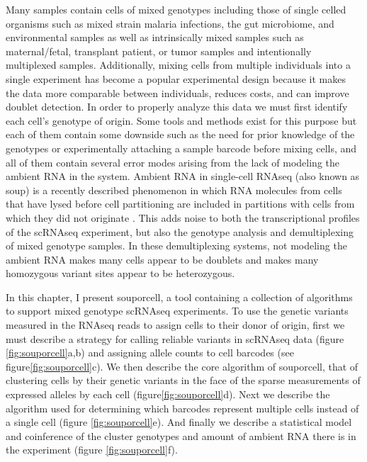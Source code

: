 \par{
Many samples contain cells of mixed genotypes including those of single celled organisms such as mixed strain malaria infections, 
the gut microbiome, and environmental samples as well 
as intrinsically mixed samples such as maternal/fetal, transplant patient, or tumor samples and intentionally multiplexed samples.
Additionally, mixing cells from multiple individuals into a single experiment has become a popular experimental design because it makes the data more comparable between individuals, reduces costs, and can improve doublet detection. 
 In order to properly 
analyze this data we must first identify each cell's genotype of origin. Some tools and methods exist for this purpose \cite{demuxlet} \cite{cellhashing} \cite{scsplit} 
but each of them contain some downside such as the need for prior knowledge of the genotypes or experimentally attaching a sample barcode before mixing cells, and all of them 
contain several error modes arising from the lack of modeling the ambient RNA in the system. Ambient RNA in single-cell RNAseq (also known as soup) is a recently described 
phenomenon in which RNA molecules from cells that have lysed before cell partitioning are included in partitions with cells from which they did not originate \cite{soupx}. This adds noise to both the transcriptional profiles of the scRNAseq experiment, but also the genotype analysis and demultiplexing of mixed genotype samples. 
In these demultiplexing systems, not modeling the ambient RNA makes many cells appear to be doublets and makes many homozygous variant sites appear to be 
heterozygous. 
}

\par{
In this chapter, I present souporcell, a tool containing a collection of algorithms to support mixed genotype scRNAseq experiments\cite{souporcell}. 
To use the genetic variants measured in the RNAseq reads to assign cells to their donor of origin, first we must describe a strategy for calling reliable variants in scRNAseq data (figure \ref{fig:souporcell}a,b) and assigning allele counts to cell barcodes (see figure\ref{fig:souporcell}c). We then describe the core algorithm of souporcell, that of clustering cells by their genetic variants in the face of the sparse measurements of expressed alleles by each cell (figure\ref{fig:souporcell}d). Next we describe the algorithm used for determining which barcodes represent multiple cells instead of a single cell (figure \ref{fig:souporcell}e). And finally we describe a statistical model and coinference of the cluster genotypes and amount of ambient RNA there is in the experiment (figure \ref{fig:souporcell}f). 
}


